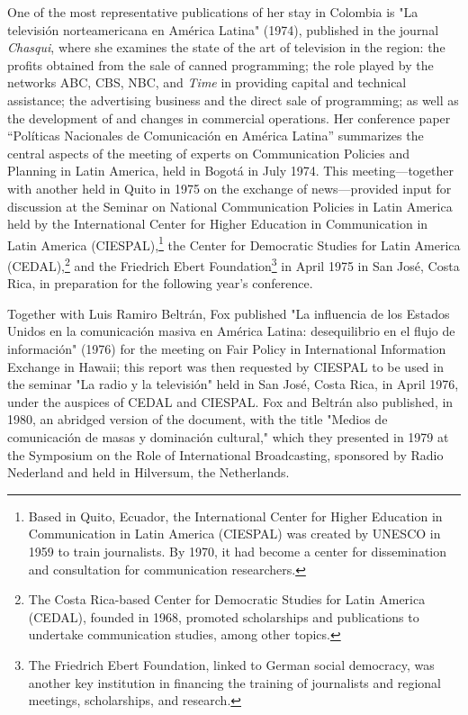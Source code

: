 \documentclass{tufte-handout}
\begin{document}
\noindent One of the most representative publications of her stay in Colombia is
"La televisión norteamericana en América Latina" (1974), published in
the journal \emph{Chasqui}, where she examines the state of the art of
television in the region: the profits obtained from the sale of canned
programming; the role played by the networks ABC, CBS, NBC, and
\emph{Time} in providing capital and technical assistance; the
advertising business and the direct sale of programming; as well as the
development of and changes in commercial operations. Her conference
paper ``Políticas Nacionales de Comunicación en América Latina''
summarizes the central aspects of the meeting of experts on
Communication Policies and Planning in Latin America, held in Bogotá in
July 1974. This meeting---together with another held in Quito in 1975 on
the exchange of news---provided input for discussion at the Seminar on
National Communication Policies in Latin America held by the
International Center for Higher Education in Communication in Latin
America (CIESPAL),\footnote{Based in Quito, Ecuador, the International
  Center for Higher Education in Communication in Latin America
  (CIESPAL) was created by UNESCO in 1959 to train journalists. By 1970,
  it had become a center for dissemination and consultation for
  communication researchers.} the Center for Democratic Studies for
Latin America (CEDAL),\footnote{The Costa Rica-based Center for
  Democratic Studies for Latin America (CEDAL), founded in 1968,
  promoted scholarships and publications to undertake communication
  studies, among other topics.} and the Friedrich Ebert
Foundation\footnote{The Friedrich Ebert Foundation, linked to German
  social democracy, was another key institution in financing the
  training of journalists and regional meetings, scholarships, and
  research.} in April 1975 in San José, Costa Rica, in preparation for
the following year's conference.

Together with Luis Ramiro Beltrán, Fox published "La influencia de los
Estados Unidos en la comunicación masiva en América Latina:
desequilibrio en el flujo de información" (1976) for the meeting on Fair
Policy in International Information Exchange in Hawaii; this report was
then requested by CIESPAL to be used in the seminar "La radio y la
televisión" held in San José, Costa Rica, in April 1976, under the
auspices of CEDAL and CIESPAL. Fox and Beltrán also published, in 1980,
an abridged version of the document, with the title "Medios de
comunicación de masas y dominación cultural," which they presented in
1979 at the Symposium on the Role of International Broadcasting,
sponsored by Radio Nederland and held in Hilversum, the Netherlands.
\end{document}
